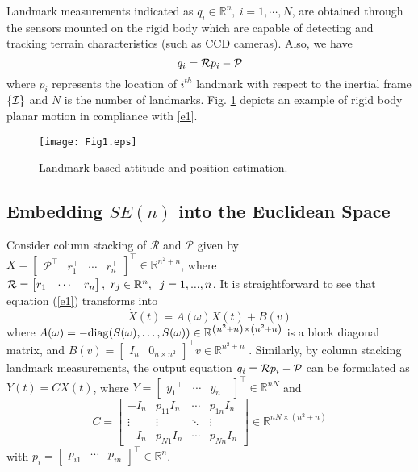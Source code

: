 \documentclass[12pt,draftcls,onecolumn]{IEEEtran}
\begin{document}
Landmark measurements indicated as ${q_i} \in {\mathbb R}^n,~i = 1, \cdots ,N $, are obtained through the sensors mounted on the rigid body which are capable of detecting and tracking terrain characteristics (such as CCD cameras). Also, we have
\[{q_i} = {\cal R}{p_i} - {\cal P}\]
where ${p_i}$ represents the location of $ {i^{th}} $ landmark with respect to the inertial frame $\left\{ {\cal I} \right\}$ and $ N $ is the number of landmarks. Fig. \ref{F1} depicts an example of rigid body planar motion in compliance with \eqref{e1}.

\begin{figure}
\centering
\texttt{[image: Fig1.eps]}
\caption{Landmark-based attitude and position estimation.}
\label{F1}
\end{figure}


\subsection{Embedding $ SE(n)$ into the Euclidean Space}

Consider column stacking of ${\mathcal R}$ and ${\mathcal P}$ given by $ X= \begin{bmatrix} {\mathcal P}^\top & r_1^\top& \cdots&  r_n^\top \end{bmatrix}^\top \in {\mathbb R}^{{n^2} + n}$, where ${\cal R} = \begin{bmatrix} r_1& \cdots&  r_n \end{bmatrix},~ {r_j} \in {\mathbb R}^n,\;\;j = 1,...,n$. It is straightforward to see that equation (\ref{e1}) transforms into
\begin{equation} \label{e2}
\dot X(t) = A(\omega )X(t) + B(v)
\end{equation}
where $A(\omega ) =  - {\mathop{\rm diag}\nolimits} (S(\omega ), \ldots ,S(\omega )) \in {{\mathbb R}^{\left( {{n^2} + n} \right) \times \left( {{n^2} + n} \right)}}$ is a block diagonal matrix, and $ B(v) = {\left[ {\begin{array}{*{20}{c}} {{I_n}}&{{0_{n \times {n^2}}}} \end{array}} \right]^\top}v \in {{\mathbb R}^{{n^2} + n}}$ .
Similarly, by column stacking landmark measurements, the output equation $ {q_i} = {\cal R}{p_i} - {\cal P}$ can be formulated as $Y(t) = CX(t)$, where $Y = {\left[ {\begin{array}{*{20}{c}} {{y_1}^\top}& \cdots &{{y_n}^\top} \end{array}} \right]^\top} \in {{\mathbb R}^{nN}}$ and $$ C = \left[ {\begin{array}{*{20}{c}} { - {I_n}}&{{p_{11}}{I_n}}& \cdots &{{p_{1n}}{I_n}}\\  \vdots & \vdots & \ddots & \vdots \\
{ - {I_n}}&{{p_{N1}}{I_n}}& \cdots &{{p_{Nn}}{I_n}} \end{array}} \right] \in {{\mathbb R}^{nN \times ({n^2} + n)}}$$
with ${p_i} = {\left[ {\begin{array}{*{20}{c}} {{p_{i1}}}& \cdots &{{p_{in}}} \end{array}} \right]^{\top} } \in {{\mathbb R}^n}$.
\end{document}
